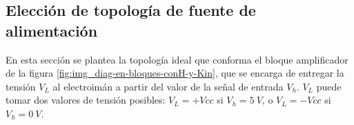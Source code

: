 




\subsection{Elección de topología de fuente de alimentación}\label{sec_topologia-fuente-alimentacion}

%
%

En esta sección se plantea la topología ideal que conforma el bloque amplificador de la figura \ref{fig:img_diag-en-bloques-conH-y-Kin}, que se encarga de entregar la tensión $V_L$ al electroimán a partir del valor de la señal de entrada $V_h$. $V_L$ puede tomar dos valores de tensión posibles: $V_L=+Vcc$ si $V_h=5\:V$, o $V_L=-Vcc$ si $V_h=0\:V$.

